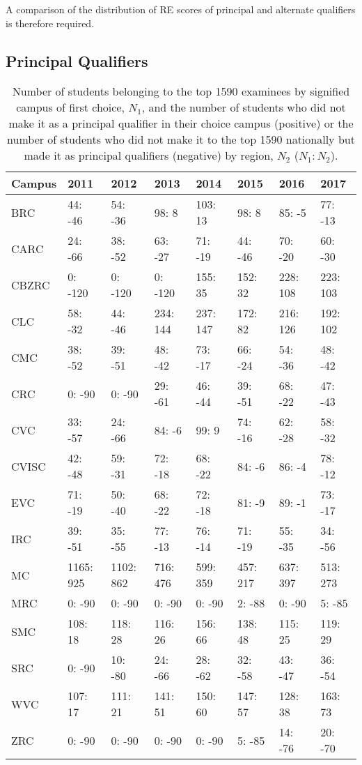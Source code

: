 \documentclass[]{article}
\begin{document}
A comparison of the distribution of RE scores of principal and alternate
qualifiers is therefore required.

\hypertarget{principal-qualifiers}{%
\subsection{Principal Qualifiers}\label{principal-qualifiers}}

\begin{table}

\caption{\label{tab:unnamed-chunk-5}Number of students belonging to the top 1590 examinees by signified campus of first choice, $N_1$, and the number of students who did not make it as a principal qualifier in their choice campus (positive) or the number of students who did not make it to the top 1590 nationally but made it as principal qualifiers (negative) by region, $N_2$ ($N_1: N_2$).}
\centering
\begin{tabular}[t]{llllllll}
\toprule
Campus & 2011 & 2012 & 2013 & 2014 & 2015 & 2016 & 2017\\
\midrule
BRC & 44: -46 & 54: -36 & 98: 8 & 103: 13 & 98: 8 & 85: -5 & 77: -13\\
CARC & 24: -66 & 38: -52 & 63: -27 & 71: -19 & 44: -46 & 70: -20 & 60: -30\\
CBZRC & 0: -120 & 0: -120 & 0: -120 & 155: 35 & 152: 32 & 228: 108 & 223: 103\\
CLC & 58: -32 & 44: -46 & 234: 144 & 237: 147 & 172: 82 & 216: 126 & 192: 102\\
CMC & 38: -52 & 39: -51 & 48: -42 & 73: -17 & 66: -24 & 54: -36 & 48: -42\\
\addlinespace
CRC & 0: -90 & 0: -90 & 29: -61 & 46: -44 & 39: -51 & 68: -22 & 47: -43\\
CVC & 33: -57 & 24: -66 & 84: -6 & 99: 9 & 74: -16 & 62: -28 & 58: -32\\
CVISC & 42: -48 & 59: -31 & 72: -18 & 68: -22 & 84: -6 & 86: -4 & 78: -12\\
EVC & 71: -19 & 50: -40 & 68: -22 & 72: -18 & 81: -9 & 89: -1 & 73: -17\\
IRC & 39: -51 & 35: -55 & 77: -13 & 76: -14 & 71: -19 & 55: -35 & 34: -56\\
\addlinespace
MC & 1165: 925 & 1102: 862 & 716: 476 & 599: 359 & 457: 217 & 637: 397 & 513: 273\\
MRC & 0: -90 & 0: -90 & 0: -90 & 0: -90 & 2: -88 & 0: -90 & 5: -85\\
SMC & 108: 18 & 118: 28 & 116: 26 & 156: 66 & 138: 48 & 115: 25 & 119: 29\\
SRC & 0: -90 & 10: -80 & 24: -66 & 28: -62 & 32: -58 & 43: -47 & 36: -54\\
WVC & 107: 17 & 111: 21 & 141: 51 & 150: 60 & 147: 57 & 128: 38 & 163: 73\\
ZRC & 0: -90 & 0: -90 & 0: -90 & 0: -90 & 5: -85 & 14: -76 & 20: -70\\
\bottomrule
\end{tabular}
\end{table}
\end{document}
